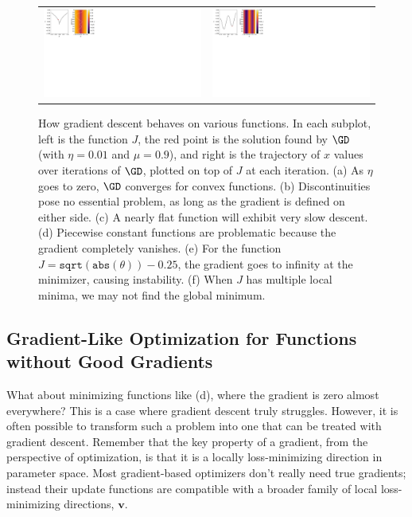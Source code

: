 \begin{figure}[h!]
{\begin{tabular}{cc}
        \includegraphics[width=0.5\linewidth]{./figures/gradient_descent/grad_descent_ex5.pdf} & \includegraphics[width=0.5\linewidth]{./figures/gradient_descent/grad_descent_ex6.pdf}
    \end{tabular}
    }
    \caption{How gradient descent behaves on various functions. In each subplot, left is the function $J$, the red point is the solution found by $\GD$ (with $\eta=0.01$ and $\mu=0.9$), and right is the trajectory of $x$ values over iterations of $\GD$, plotted on top of $J$ at each iteration. (a) As $\eta$ goes to zero, $\GD$ converges for convex functions. (b) Discontinuities pose no essential problem, as long as the gradient is defined on either side. (c) A nearly flat function will exhibit very slow descent. (d) Piecewise constant functions are problematic because the gradient completely vanishes. (e) For the function $J=\texttt{sqrt}(\texttt{abs}(\theta))-0.25$, the gradient goes to infinity at the minimizer, causing instability. (f) When $J$ has multiple local minima, we may not find the global minimum.}
    \label{fig-gradient_descent-grad_descent_simple_examples}
\end{figure}


\subsection{Gradient-Like Optimization for Functions without Good Gradients}\label{sec-gradient_descent-zeroth_order}
What about minimizing functions like \fig{\ref{fig-gradient_descent-grad_descent_simple_examples}}(d), where the gradient is zero almost everywhere? This is a case where gradient descent truly struggles. However, it is often possible to transform such a problem into one that can be treated with gradient descent. Remember that the key property of a gradient, from the perspective of optimization, is that it is a locally loss-minimizing direction in parameter space. Most gradient-based optimizers don't really need true gradients; instead their update functions are compatible with a broader family of local loss-minimizing directions, $\mathbf{v}$. 

